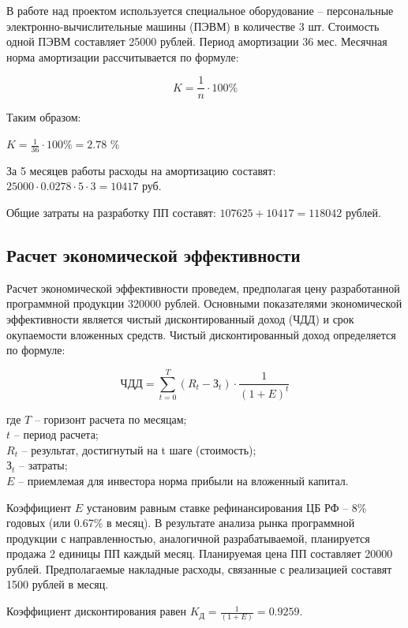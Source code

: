 \normalsize

В работе над проектом используется специальное оборудование – персональные электронно-вычислительные машины (ПЭВМ) в количестве 3 шт. Стоимость одной ПЭВМ составляет 25000 рублей. Период амортизации 36 мес.
Месячная норма амортизации рассчитывается по формуле:

\begin{equation}
K = \frac{1}{n} \cdot 100\%
\label{F:amortMonth}
\end{equation}

Таким образом:

$K = \frac{1}{36} \cdot 100\% = 2.78$ \%

За 5 месяцев работы расходы на амортизацию составят: $25000 \cdot 0.0278 \cdot 5 \cdot 3 = 10417$ руб.

Общие затраты на разработку ПП составят: $107625 + 10417 = 118042$ рублей.

\subsection{Расчет экономической эффективности}
Расчет экономической эффективности проведем, предполагая цену разработанной программной продукции 320000 рублей.
Основными показателями экономической эффективности является чистый дисконтированный доход (ЧДД) и срок окупаемости вложенных средств.
Чистый дисконтированный доход определяется по формуле:

\begin{equation}
\text{ЧДД} = \sum_{t=0}^{T} {(R_t - \text{З}_t) \cdot \frac{1}{(1 + E)^t}}
\label{F:ChDD}
\end{equation}

где $T$ – горизонт расчета по месяцам; \\ $t$ – период расчета; \\ $R_t$ – результат, достигнутый на t шаге (стоимость); \\ $\text{З}_t$ – затраты; \\ $E$ – приемлемая для инвестора норма прибыли на вложенный капитал.

Коэффициент $E$ установим равным ставке рефинансирования ЦБ РФ – 8\% годовых (или 0.67\% в месяц). В результате анализа рынка программной продукции с направленностью, аналогичной разрабатываемой, планируется продажа 2 единицы ПП каждый месяц. Планируемая цена ПП составляет 20000 рублей. Предполагаемые накладные расходы, связанные с реализацией составят 1500 рублей в месяц.

Коэффициент дисконтирования равен $K_{\text{Д}} = \frac{1}{(1 + E)} = 0.9259$.


